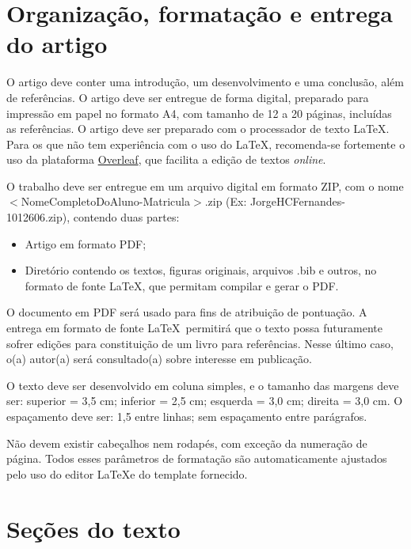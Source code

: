 \documentclass[12pt]{article}
\begin{document}
	\section{\label{organizacao:artigo}Organização, formatação e entrega do artigo} 
	
	O artigo deve conter uma introdução, um desenvolvimento e uma conclusão, além de referências. 
	O artigo deve ser entregue de forma digital, preparado para impressão em papel no formato A4, com tamanho de 12 a 20 páginas, incluídas as referências.
	O artigo deve ser preparado com o processador de texto \LaTeX.
	Para os que não tem experiência com o uso do \LaTeX, recomenda-se fortemente o uso da plataforma \href{http://www.overleaf.com}{Overleaf}, que facilita a edição de textos \textit{online}.
	
	O trabalho deve ser entregue em um arquivo digital em formato ZIP, com o nome $<$NomeCompletoDoAluno-Matricula$>$.zip (Ex: JorgeHCFernandes-1012606.zip), contendo duas partes:
	\begin{itemize}
		\item Artigo em formato PDF;
		\item Diretório contendo os textos, figuras originais, arquivos .bib e outros, no formato de fonte \LaTeX, que permitam compilar e gerar o PDF. 
	\end{itemize}
	
	O documento em PDF será usado para fins de atribuição de pontuação. 
	A entrega em formato de fonte \LaTeX\ permitirá que o texto possa futuramente sofrer edições para constituição de um livro para referências. 
	Nesse último caso, o(a) autor(a) será consultado(a) sobre interesse em publicação. 
	
	O texto deve ser desenvolvido em coluna simples, e o tamanho das margens deve ser: superior = 3,5 cm; inferior = 2,5 cm; esquerda = 3,0 cm; direita = 3,0 cm. 
	O espaçamento deve ser: 1,5 entre linhas; sem espaçamento entre parágrafos.
	
	Não devem existir cabeçalhos nem rodapés, com exceção da numeração de página. 
	Todos esses parâmetros de formatação são automaticamente ajustados pelo uso do editor \LaTeX e do template fornecido.
	
	\section{\label{secoes:texto}Seções do texto}
	
\end{document}
